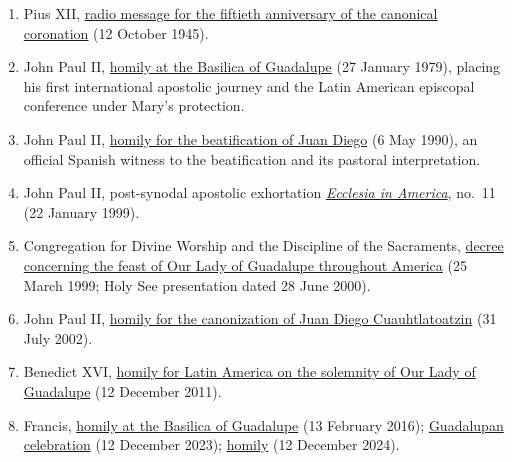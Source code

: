 \begin{enumerate}
  \item Pius XII, \href{https://www.vatican.va/content/pius-xii/es/speeches/1945/documents/hf_p-xii_spe_19451012_guadalupe-mexico.html}{radio message for the fiftieth anniversary of the canonical coronation} (12 October 1945).

  \item John Paul II, \href{https://www.vatican.va/content/john-paul-ii/en/homilies/1979/documents/hf_jp-ii_hom_19790127_messico-guadalupe.html}{homily at the Basilica of Guadalupe} (27 January 1979), placing his first international apostolic journey and the Latin American episcopal conference under Mary's protection.

  \item John Paul II, \href{https://www.vatican.va/content/john-paul-ii/es/homilies/1990/documents/hf_jp-ii_hom_19900506_citta-del-messico.html}{homily for the beatification of Juan Diego} (6 May 1990), an official Spanish witness to the beatification and its pastoral interpretation.

  \item John Paul II, post-synodal apostolic exhortation \href{https://www.vatican.va/content/john-paul-ii/en/apost_exhortations/documents/hf_jp-ii_exh_22011999_ecclesia-in-america.html}{\emph{Ecclesia in America}}, no.~11 (22 January 1999).

  \item Congregation for Divine Worship and the Discipline of the Sacraments, \href{https://www.vatican.va/roman_curia/congregations/ccdds/documents/rc_con_ccdds_doc_20000628_guadalupe_sp.html}{decree concerning the feast of Our Lady of Guadalupe throughout America} (25 March 1999; Holy See presentation dated 28 June 2000).

  \item John Paul II, \href{https://www.vatican.va/content/john-paul-ii/en/homilies/2002/documents/hf_jp-ii_hom_20020731_canonization-mexico.html}{homily for the canonization of Juan Diego Cuauhtlatoatzin} (31 July 2002).

  \item Benedict XVI, \href{https://www.vatican.va/content/benedict-xvi/en/homilies/2011/documents/hf_ben-xvi_hom_20111212_america-latina.html}{homily for Latin America on the solemnity of Our Lady of Guadalupe} (12 December 2011).

  \item Francis, \href{https://www.vatican.va/content/francesco/en/homilies/2016/documents/papa-francesco_20160213_omelia-messico-guadalupe.html}{homily at the Basilica of Guadalupe} (13 February 2016); \href{https://press.vatican.va/content/salastampa/en/bollettino/pubblico/2023/12/12/231212d.html}{Guadalupan celebration} (12 December 2023); \href{https://www.vatican.va/content/francesco/es/homilies/2024/documents/20241212-omelia-guadalupe.html}{homily} (12 December 2024).


\end{enumerate}
